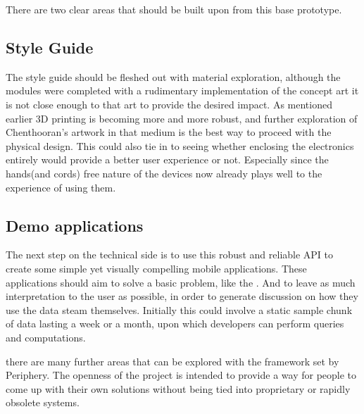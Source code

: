 
There are two clear areas that should be built upon from this base prototype.

\subsection{Style Guide}

The style guide should be fleshed out with material exploration, although the modules were completed with a rudimentary implementation of the concept art it is not close enough to that art to provide the desired impact. As mentioned earlier 3D printing is becoming more and more robust, and further exploration of Chenthooran's artwork in that medium is the best way to proceed with the physical design. This could also tie in to seeing whether enclosing the electronics entirely would provide a better user experience or not. Especially since the hands(and cords) free nature of the devices now already plays well to the experience of using them.

\subsection{Demo applications}

The next step on the technical side is to use this robust and reliable API to create some simple yet visually compelling mobile applications. These applications should aim to solve a basic problem, like the . And to leave as much interpretation to the user as possible, in order to generate discussion on how they use the data steam themselves. Initially this could involve a static sample chunk of data lasting a week or a month, upon which developers can perform queries and computations. 

 there are many further areas that can be explored with the framework set by Periphery. The openness of the project is intended to provide a way for people to come up with their own solutions without being tied into proprietary or rapidly obsolete systems.